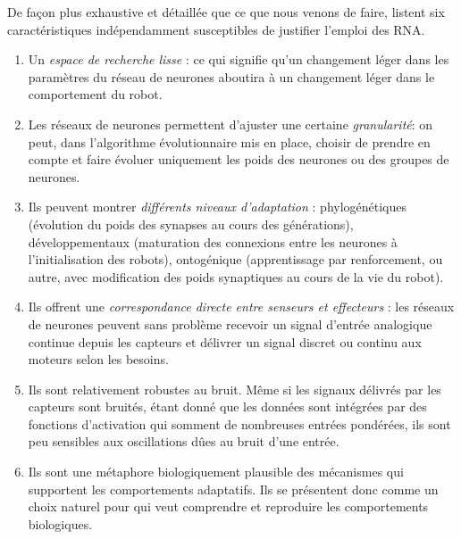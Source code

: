 De façon plus exhaustive et détaillée que ce que nous venons de faire, \citet[p. 39]{nolfi00evolrobobiolintetechselfmach} listent six caractéristiques indépendamment susceptibles de justifier l'emploi des RNA.
\begin{enumerate}
   \item Un \emph{espace de recherche lisse} : ce qui signifie qu'un changement léger dans les paramètres du réseau de neurones aboutira à un changement léger dans le comportement du robot.%
   \item Les réseaux de neurones permettent d'ajuster une certaine \emph{granularité}: on peut, dans l'algorithme évolutionnaire mis en place, choisir de prendre en compte et faire évoluer uniquement les poids des neurones ou des groupes de neurones.
   \item Ils peuvent montrer \emph{différents niveaux d'adaptation} : phylogénétiques (évolution du poids des synapses au cours des générations), développementaux (maturation des connexions entre les neurones à l'initialisation des robots), ontogénique (apprentissage par renforcement, ou autre, avec modification des poids synaptiques au cours de la vie du robot).
   \item Ils offrent une \emph{correspondance directe entre senseurs et effecteurs} : les réseaux de neurones peuvent sans problème recevoir un signal d'entrée analogique continue depuis les capteurs et délivrer un signal discret ou continu aux moteurs selon les besoins.
   \item Ils sont relativement robustes au bruit. Même si les signaux délivrés par les capteurs sont bruités, étant donné que les données sont intégrées par des fonctions d'activation qui somment de nombreuses entrées pondérées, ils sont peu sensibles aux oscillations dûes au bruit d'une entrée.
   \item Ils sont une métaphore biologiquement plausible des mécanismes qui supportent les comportements adaptatifs. Ils se présentent donc comme un choix naturel pour qui veut comprendre et reproduire les comportements biologiques. \\
       \citep[Liste plus ou moins librement adaptée de ][p. 39 les emphases ont toutes été ajoutées]{nolfi00evolrobobiolintetechselfmach}
\end{enumerate}
